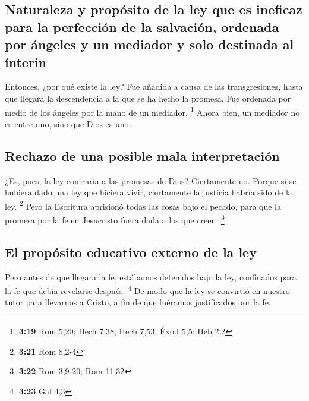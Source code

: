 \hypertarget{naturaleza-y-propuxf3sito-de-la-ley-que-es-ineficaz-para-la-perfecciuxf3n-de-la-salvaciuxf3n-ordenada-por-uxe1ngeles-y-un-mediador-y-solo-destinada-al-uxednterin}{%
\subsection{Naturaleza y propósito de la ley que es ineficaz para la
perfección de la salvación, ordenada por ángeles y un mediador y solo
destinada al
ínterin}\label{naturaleza-y-propuxf3sito-de-la-ley-que-es-ineficaz-para-la-perfecciuxf3n-de-la-salvaciuxf3n-ordenada-por-uxe1ngeles-y-un-mediador-y-solo-destinada-al-uxednterin}}

 Entonces, ¿por qué existe la ley? Fue añadida a causa de
las transgresiones, hasta que llegara la descendencia a la que se ha
hecho la promesa. Fue ordenada por medio de los ángeles por la mano de
un mediador. \footnote{\textbf{3:19} Rom 5,20; Hech 7,38; Hech 7,53;
  Éxod 5,5; Heb 2,2}  Ahora bien, un mediador no es entre
uno, sino que Dios es uno.

\hypertarget{rechazo-de-una-posible-mala-interpretaciuxf3n}{%
\subsection{Rechazo de una posible mala
interpretación}\label{rechazo-de-una-posible-mala-interpretaciuxf3n}}

 ¿Es, pues, la ley contraria a las promesas de Dios?
Ciertamente no. Porque si se hubiera dado una ley que hiciera vivir,
ciertamente la justicia habría sido de la ley. \footnote{\textbf{3:21}
  Rom 8,2-4}  Pero la Escritura aprisionó todas las cosas
bajo el pecado, para que la promesa por la fe en Jesucristo fuera dada a
los que creen. \footnote{\textbf{3:22} Rom 3,9-20; Rom 11,32}

\hypertarget{el-propuxf3sito-educativo-externo-de-la-ley}{%
\subsection{El propósito educativo externo de la
ley}\label{el-propuxf3sito-educativo-externo-de-la-ley}}

 Pero antes de que llegara la fe, estábamos detenidos
bajo la ley, confinados para la fe que debía revelarse después.
\footnote{\textbf{3:23} Gal 4,3}  De modo que la ley se
convirtió en nuestro tutor para llevarnos a Cristo, a fin de que
fuéramos justificados por la fe.


